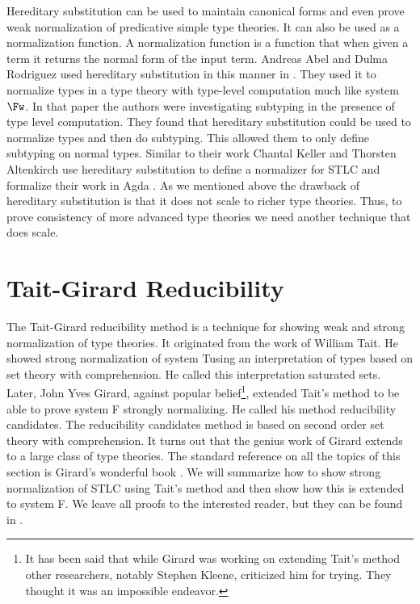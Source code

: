 Hereditary substitution can be used to maintain canonical
forms and
even prove weak normalization of predicative simple type theories.  It
can also be used as a normalization function.  A normalization
function is a function that when given a term it returns the normal
form of the input term.  Andreas Abel and Dulma Rodriguez used
hereditary substitution in this manner in \cite{Abel:2008}.  They used
it to normalize types in a type theory with type-level computation
much like system $\Fw$.  In that paper the authors were investigating
subtyping in the presence of type level computation.  They found that
hereditary substitution could be used to normalize types and then do
subtyping.  This allowed them to only define subtyping on normal
types.  Similar to their work Chantal Keller and Thorsten Altenkirch
use hereditary substitution to define a normalizer for STLC and
formalize their work in Agda \cite{Keller:2010}.
As we mentioned above the drawback of hereditary substitution is that
it does not scale to richer type theories.  Thus, to prove consistency
of more advanced type theories we need another technique that does
scale.

\section{Tait-Girard Reducibility}
\label{sec:tait-griard_reduciblity}
The Tait-Girard reducibility method is a technique for showing weak and
strong normalization of type theories.  It originated from the work of
William Tait.  He showed strong normalization of system
Tusing an
interpretation of types based on set theory with comprehension.  He
called this interpretation saturated sets.  Later, John Yves Girard,
against popular belief\footnote{It has been said that while Girard was
  working on extending Tait's method other researchers, notably
  Stephen Kleene, criticized him for trying.  They thought it was an
  impossible endeavor.}, extended Tait's method to be able to prove
system F strongly normalizing.  He called his method reducibility
candidates. The reducibility candidates method is based on second order
set theory with comprehension.  It turns out that the genius work of
Girard extends to a large class of type theories. The standard
reference on all the topics of this section is Girard's wonderful book
\cite{Girard:1989}.  We will summarize how to show strong
normalization of STLC using Tait's method and then show how this is
extended to system F.  We leave all proofs to the interested reader,
but they can be found in \cite{Girard:1989}.


